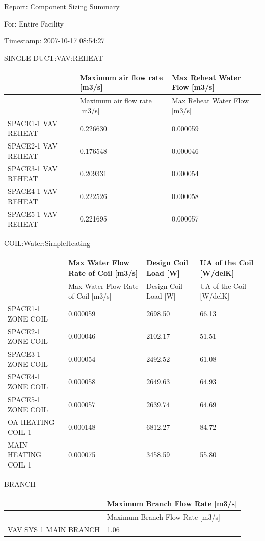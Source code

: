 Report: Component Sizing Summary

For: Entire Facility

Timestamp: 2007-10-17 08:54:27

SINGLE DUCT:VAV:REHEAT

\begin{longtable}[c]{>{\raggedright}p{1.52in}>{\raggedright}p{2.24in}>{\raggedright}p{2.24in}}
\toprule
~ & Maximum air flow rate [m3/s] & Max Reheat Water Flow [m3/s] \tabularnewline
\midrule
\endfirsthead

\toprule
~ & Maximum air flow rate [m3/s] & Max Reheat Water Flow [m3/s] \tabularnewline
\midrule
\endhead

SPACE1-1 VAV REHEAT & 0.226630 & 0.000059 \tabularnewline
SPACE2-1 VAV REHEAT & 0.176548 & 0.000046 \tabularnewline
SPACE3-1 VAV REHEAT & 0.209331 & 0.000054 \tabularnewline
SPACE4-1 VAV REHEAT & 0.222526 & 0.000058 \tabularnewline
SPACE5-1 VAV REHEAT & 0.221695 & 0.000057 \tabularnewline
\bottomrule
\end{longtable}

COIL:Water:SimpleHeating

\begin{longtable}[c]{>{\raggedright}p{1.5in}>{\raggedright}p{1.5in}>{\raggedright}p{1.5in}>{\raggedright}p{1.5in}}
\toprule
~ & Max Water Flow Rate of Coil [m3/s] & Design Coil Load [W] & UA of the Coil [W/delK] \tabularnewline
\midrule
\endfirsthead

\toprule
~ & Max Water Flow Rate of Coil [m3/s] & Design Coil Load [W] & UA of the Coil [W/delK] \tabularnewline
\midrule
\endhead

SPACE1-1 ZONE COIL & 0.000059 & 2698.50 & 66.13 \tabularnewline
SPACE2-1 ZONE COIL & 0.000046 & 2102.17 & 51.51 \tabularnewline
SPACE3-1 ZONE COIL & 0.000054 & 2492.52 & 61.08 \tabularnewline
SPACE4-1 ZONE COIL & 0.000058 & 2649.63 & 64.93 \tabularnewline
SPACE5-1 ZONE COIL & 0.000057 & 2639.74 & 64.69 \tabularnewline
OA HEATING COIL 1 & 0.000148 & 6812.27 & 84.72 \tabularnewline
MAIN HEATING COIL 1 & 0.000075 & 3458.59 & 55.80 \tabularnewline
\bottomrule
\end{longtable}

BRANCH

\begin{longtable}[c]{@{}ll@{}}
\toprule
~ & Maximum Branch Flow Rate [m3/s] \tabularnewline
\midrule
\endfirsthead

\toprule
~ & Maximum Branch Flow Rate [m3/s] \tabularnewline
\midrule
\endhead

VAV SYS 1 MAIN BRANCH & 1.06 \tabularnewline
\bottomrule
\end{longtable}

